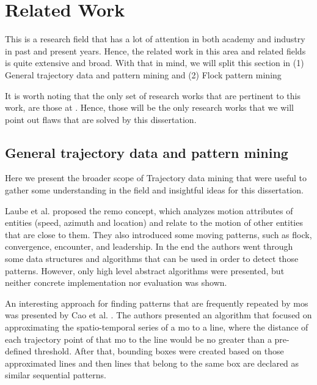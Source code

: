 \chapter{Related Work}
\label{chp:relatedwork}
This is a research field that has a lot of attention in both academy and industry in past and present years. Hence, the
related work in this area and related fields is quite extensive and broad. With that in mind, we will split this section
in (1) General trajectory data and pattern mining and (2) Flock pattern mining

It is worth noting that the only set of research works that are pertinent to this work, are those at
. Hence, those will be the only research works that we will point out flaws that are solved by
this dissertation.

\section{General trajectory data and pattern mining}
\label{sec:rel_general}
Here we present the broader scope of Trajectory data mining that were useful to gather some understanding in the field
and insightful ideas for this dissertation.

Laube et al. \citep{remo} proposed the \ac{remo} concept, which analyzes motion attributes of entities (speed, azimuth
and location) and relate to the motion of other entities that are close to them. They also introduced some moving
patterns, such as flock, convergence, encounter, and leadership. In the end the authors went through some data
structures and algorithms that can be used in order to detect those patterns. However, only high level abstract
algorithms were presented, but neither concrete implementation nor evaluation was shown.

An interesting approach for finding patterns that are frequently repeated by \acp{mo} was presented by Cao et al.
\citep{frequentpatterns}. The authors presented an algorithm that focused on approximating the spatio-temporal series of
a \ac{mo} to a line, where the distance of each trajectory point of that \ac{mo} to the line would be no greater than a
pre-defined threshold. After that, bounding boxes were created based on those approximated lines and then lines that
belong to the same box are declared as similar sequential patterns.

